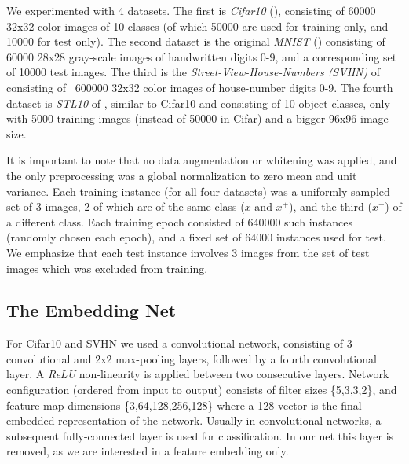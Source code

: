 \documentclass{article} %
\begin{document}
We experimented with  4 datasets.  The first is \emph{Cifar10}  (\citet{krizhevsky2009learning}), consisting of 60000 32x32 color images of 10 classes (of which 50000 are used for training only, and 10000 for test only). 
The second dataset is the original \emph{MNIST} (\citet{lecun1998gradient}) consisting of 60000 28x28 gray-scale images of handwritten digits 0-9, and a corresponding set of 10000 test images.
The third is the  \emph{Street-View-House-Numbers (SVHN)} of \citet{netzer2011reading} consisting of ~600000 32x32 color images of house-number digits 0-9.
The fourth dataset   is \emph{STL10} of \citet{coates2011analysis}, similar to Cifar10 and consisting of 10 object classes, only with 5000 training images (instead of 50000 in Cifar) and a bigger 96x96 image size.


It is important to note that no data augmentation or whitening was applied, and the only preprocessing was a global normalization to zero mean and unit variance.
Each training instance (for all four datasets) was a uniformly sampled set of 3 images, 2 of which are of the same class ($x$ and $x^{+}$), and the third ($x^{-}$)  of a different class. Each training epoch consisted of 640000 such instances (randomly chosen each epoch), and a fixed set of 64000 instances used for test. We emphasize that each test instance involves 3 images from the set of test images which was excluded from training.
\subsection{The Embedding Net}
For Cifar10 and SVHN we used a convolutional network, consisting of 3 convolutional and 2x2 max-pooling layers, followed by a fourth convolutional layer. A \emph{ReLU} non-linearity is applied between two consecutive layers.
Network configuration (ordered from input to output) consists of filter sizes \{5,3,3,2\}, and feature map dimensions \{3,64,128,256,128\} where a 128 vector is the final embedded representation of the network. Usually in convolutional networks, a subsequent fully-connected
layer is used for classification. In our net this layer is removed, as we are interested in a feature embedding only.
\end{document}
